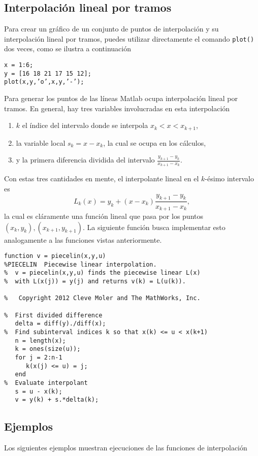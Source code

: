 \documentclass[12pt,letterpaper]{article}
\begin{document}
\subsection{Interpolaci\'on lineal por tramos}
Para crear un gr\'afico de un conjunto de puntos de interpolaci\'on y su interpolaci\'on lineal por tramos, puedes utilizar directamente el comando \texttt{plot()} dos veces, como se ilustra a continuaci\'on
\begin{verbatim}
x = 1:6;
y = [16 18 21 17 15 12];
plot(x,y,’o’,x,y,’-’);
\end{verbatim}
Para generar los puntos de las l\'ineas Matlab ocupa interpolaci\'on lineal por tramos. En general, hay tres variables involucradas en esta interpolaci\'on
\begin{enumerate}
\item $k$ el \'indice del intervalo donde se interpola  $x_k<x<x_{k+1}$,
\item la variable local $s_k=x-x_k$, la cual se ocupa en los c\'alculos, 
\item y la primera diferencia dividida del intervalo $\frac{y_{k+1}-y_k}{x_{k+1}-x_k}$.
\end{enumerate}
Con estas tres cantidades en mente, el interpolante lineal en el $k$-\'esimo intervalo es
$$
L_k(x)=y_k+(x-x_k)\frac{y_{k+1}-y_k}{x_{k+1}-x_k},
$$
la cual es cl\'aramente una funci\'on lineal que pasa por los puntos $(x_k,y_k),(x_{k+1},y_{k+1})$.  La siguiente funci\'on busca implementar esto analogamente a las funciones vistas anteriormente.
\begin{verbatim}
function v = piecelin(x,y,u)
%PIECELIN  Piecewise linear interpolation.
%  v = piecelin(x,y,u) finds the piecewise linear L(x)
%  with L(x(j)) = y(j) and returns v(k) = L(u(k)).

%   Copyright 2012 Cleve Moler and The MathWorks, Inc.

%  First divided difference
   delta = diff(y)./diff(x);
%  Find subinterval indices k so that x(k) <= u < x(k+1)
   n = length(x);
   k = ones(size(u));
   for j = 2:n-1
      k(x(j) <= u) = j;
   end
%  Evaluate interpolant
   s = u - x(k);
   v = y(k) + s.*delta(k);
\end{verbatim}

\newpage
\subsection{Ejemplos}

Los siguientes ejemplos muestran ejecuciones de las funciones de interpolaci\'on
\end{document}
